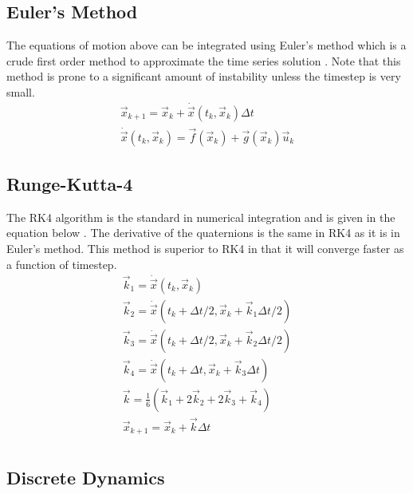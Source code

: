 \documentclass{article}
\begin{document}
\subsection{Euler's Method}

The equations of motion above can be integrated using Euler's method
which is a crude first order method to approximate the time series
solution \cite{Chapra_MEANALYSIS}. Note that this method is prone to a 
significant amount of instability unless the timestep is very small. 
\begin{equation}
  \begin{matrix}
    \vec{x}_{k+1} = \vec{x}_k + \dot{\vec{x}}(t_k,\vec{x}_k) \Delta t \\
    \dot{\vec{x}}(t_k,\vec{x}_k) = \vec{f}(\vec{x}_k) + \vec{g}(\vec{x}_k)\vec{u}_k
  \end{matrix}
\end{equation}

\subsection{Runge-Kutta-4}

The RK4 algorithm is the standard in numerical integration and is
given in the equation below \cite{Chapra_MEANALYSIS}. The derivative
of the quaternions is the same in RK4 as it is in Euler's method. This
method is superior to RK4 in that it will converge faster as a
function of timestep.
\begin{equation}
  \begin{matrix}
    \vec{k}_1 = \dot{\vec{x}}(t_k,\vec{x}_k)\\
    \vec{k}_2 = \dot{\vec{x}}(t_k+\Delta t/2,\vec{x}_k+\vec{k}_1\Delta t/2)\\
    \vec{k}_3 = \dot{\vec{x}}(t_k+\Delta t/2,\vec{x}_k+\vec{k}_2\Delta t/2)\\
    \vec{k}_4 = \dot{\vec{x}}(t_k+\Delta t,\vec{x}_k+\vec{k}_3\Delta t)\\
    \vec{k} = \frac{1}{6}(\vec{k}_1 + 2\vec{k}_2 + 2\vec{k}_3 + \vec{k}_4)\\
    \vec{x}_{k+1} = \vec{x}_k + \vec{k} \Delta t \\
  \end{matrix}
\end{equation}

\subsection{Discrete Dynamics}
\end{document}
